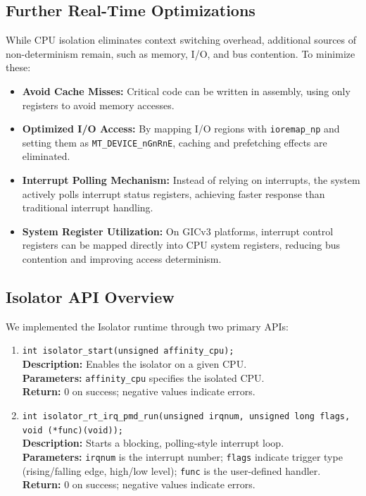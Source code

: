 \documentclass[letterpaper]{article}
\begin{document}
\subsection{Further Real-Time Optimizations}
While CPU isolation eliminates context switching overhead, additional sources of non-determinism
remain, such as memory, I/O, and bus contention. To minimize these:
\begin{itemize}
    \item \textbf{Avoid Cache Misses:} Critical code can be written in assembly, using only registers
    to avoid memory accesses.
    \item \textbf{Optimized I/O Access:} By mapping I/O regions with \texttt{ioremap\_np} and setting
    them as \texttt{MT\_DEVICE\_nGnRnE}, caching and prefetching effects are eliminated.
    \item \textbf{Interrupt Polling Mechanism:} Instead of relying on interrupts, the system actively
    polls interrupt status registers, achieving faster response than traditional interrupt handling.
    \item \textbf{System Register Utilization:} On GICv3 platforms, interrupt control registers can
    be mapped directly into CPU system registers, reducing bus contention and improving access
    determinism.
\end{itemize}

\subsection{Isolator API Overview}
We implemented the Isolator runtime through two primary APIs:
\begin{enumerate}
    \item \texttt{int isolator\_start(unsigned affinity\_cpu);} \\
    \textbf{Description:} Enables the isolator on a given CPU. \\
    \textbf{Parameters:} \texttt{affinity\_cpu} specifies the isolated CPU. \\
    \textbf{Return:} 0 on success; negative values indicate errors.
    \item \texttt{int isolator\_rt\_irq\_pmd\_run(unsigned irqnum, unsigned long flags, void (*func)(void));} \\
    \textbf{Description:} Starts a blocking, polling-style interrupt loop. \\
    \textbf{Parameters:} \texttt{irqnum} is the interrupt number; \texttt{flags} indicate trigger
    type (rising/falling edge, high/low level); \texttt{func} is the user-defined handler. \\
    \textbf{Return:} 0 on success; negative values indicate errors.
\end{enumerate}
\end{document}
